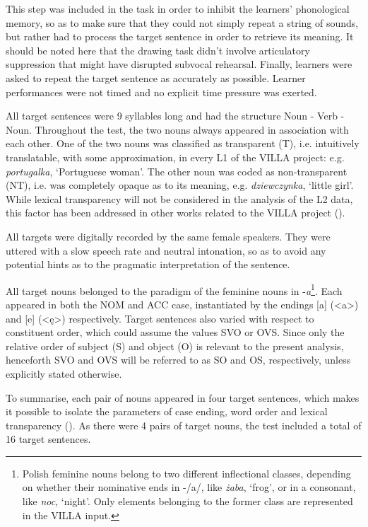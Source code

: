 This step was included in the task in order to inhibit the learners' phonological memory, so as to make sure that they could not simply repeat a string of sounds, but rather had to process the target sentence in order to retrieve its meaning. It should be noted here that the drawing task didn’t involve articulatory suppression that might have disrupted subvocal rehearsal. Finally, learners were asked to repeat the target sentence as accurately as possible. Learner performances were not timed and no explicit time pressure was exerted.

All target sentences were 9 syllables long and had the structure Noun - Verb - Noun. Throughout the test, the two nouns always appeared in association with each other. One of the two nouns was classified as transparent (T), i.e. intuitively translatable, with some approximation, in every L1 of the VILLA project: e.g. \textit{portugalka}, ‘Portuguese woman’. The other noun was coded as non-transparent (NT), i.e. was completely opaque as to its meaning, e.g. \textit{dziewczynka}, ‘little girl’. While lexical transparency will not be considered in the analysis of the L2 data, this factor has been addressed in other works related to the VILLA project (\citealt{HinzEtAl2013, Saturno2014, Rast2015}). 

All targets were digitally recorded by the same female speakers. They were uttered with a slow speech rate and neutral intonation, so as to avoid any potential hints as to the pragmatic interpretation of the sentence. 

All target nouns belonged to the paradigm of the feminine nouns in -\textit{a}\footnote{Polish feminine nouns belong to two different inflectional classes, depending on whether their nominative ends in -/a/, like \textit{żaba}, ‘frog’, or in a consonant, like \textit{noc}, ‘night’. Only elements belonging to the former class are represented in the VILLA input.}. Each appeared in both the NOM and ACC case, instantiated by the endings [a] (<a>) and [e] (<ę>) respectively. Target sentences also varied with respect to constituent order, which could assume the values SVO or OVS. Since only the relative order of subject (S) and object (O) is relevant to the present analysis, henceforth SVO and OVS will be referred to as SO and OS, respectively, unless explicitly stated otherwise.

To summarise, each pair of nouns appeared in four target sentences, which makes it possible to isolate the parameters of case ending, word order and lexical transparency (). As there were 4 pairs of target nouns, the test included a total of 16 target sentences.

